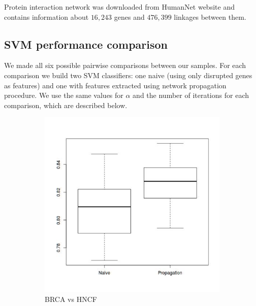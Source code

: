 \documentclass[a4paper]{article}
\begin{document}
Protein interaction network was downloaded from HumanNet website and contains
information about $16,243$ genes and $476,399$ linkages between them.

\subsection{SVM performance comparison}

We made all six possible pairwise comparisons between our samples. 
For each comparison we build two SVM classifiers: one naive 
(using only disrupted genes as features) and one with features extracted using 
network propagation procedure. We use the same
values for $\alpha$ and the number of iterations for each comparison, 
which are described below.

\begin{figure} [h]
\centering
\begin{subfigure}[b]{0.45\textwidth}
	\includegraphics[width=\textwidth]{figures/BRCA_HNCF.jpg}
	\caption{BRCA vs HNCF}
\end{subfigure}
\begin{subfigure}[b]{0.45\textwidth}

\end{subfigure}
\end{figure}
\end{document}
